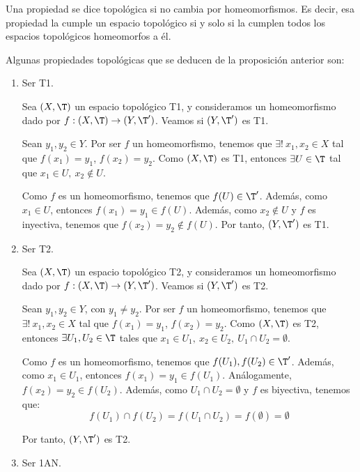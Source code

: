 \begin{definicion}
    Una propiedad se dice topológica si no cambia por homeomorfismos. Es decir, esa propiedad la cumple un espacio topológico si y solo si la cumplen todos los espacios topológicos homeomorfos a él.
\end{definicion}

\begin{ejemplo}
    Algunas propiedades topológicas que se deducen de la proposición anterior son:
    \begin{enumerate}
        \item Ser T1.

        Sea $(X,\T)$ un espacio topológico T1, y consideramos un homeomorfismo dado por $f:(X,\T)\to (Y,\T')$. Veamos si $(Y,\T')$ es T1.

        Sean $y_1,y_2\in Y$. Por ser $f$ un homeomorfismo, tenemos que $\exists!~x_1,x_2\in X$ tal que $f(x_1)=y_1$, $f(x_2)=y_2$. Como $(X,\T)$ es T1, entonces $\exists U\in \T$ tal que $x_1\in U,~x_2\notin U$.

        Como $f$ es un homeomorfismo, tenemos que $f(U)\in \T'$. Además, como $x_1\in U$, entonces $f(x_1)=y_1\in f(U)$. Además, como $x_2\notin U$ y $f$ es inyectiva, tenemos que $f(x_2)=y_2\notin f(U)$. Por tanto, $(Y,\T')$ es T1.

        \item Ser T2.
        
        Sea $(X,\T)$ un espacio topológico T2, y consideramos un homeomorfismo dado por $f:(X,\T)\to (Y,\T')$. Veamos si $(Y,\T')$ es T2.

        Sean $y_1,y_2\in Y$, con $y_1\neq y_2$. Por ser $f$ un homeomorfismo, tenemos que $\exists!~x_1,x_2\in X$ tal que $f(x_1)=y_1$, $f(x_2)=y_2$. Como $(X,\T)$ es T2, entonces $\exists U_1,U_2\in \T$ tales que $x_1\in U_1,~x_2\in U_2,~U_1\cap U_2=\emptyset$.

        Como $f$ es un homeomorfismo, tenemos que $f(U_1),f(U_2)\in \T'$. Además, como $x_1\in U_1$, entonces $f(x_1)=y_1\in f(U_1)$. Análogamente, $f(x_2)=y_2\in f(U_2)$. Además, como $U_1\cap U_2=\emptyset$ y $f$ es biyectiva, tenemos que:
        \begin{equation*}
            f(U_1)\cap f(U_2)=f(U_1\cap U_2)=f(\emptyset)=\emptyset
        \end{equation*}
        
        Por tanto, $(Y,\T')$ es T2.

        \item Ser 1AN.
        

\end{enumerate}
\end{ejemplo}
